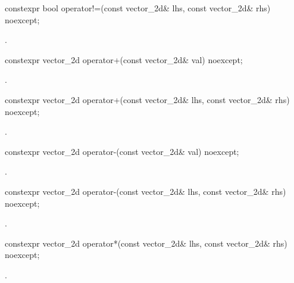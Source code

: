 %
\begin{itemdecl}
constexpr bool operator!=(const vector_2d& lhs, const vector_2d& rhs) noexcept;
\end{itemdecl}
\begin{itemdescr}
\pnum
\returns
{}.
\end{itemdescr}

%
\begin{itemdecl}
constexpr vector_2d operator+(const vector_2d& val) noexcept;
\end{itemdecl}
\begin{itemdescr}
\pnum
\returns
{}.
\end{itemdescr}

%
\begin{itemdecl}
constexpr vector_2d operator+(const vector_2d& lhs, const vector_2d& rhs) 
  noexcept;
\end{itemdecl}
\begin{itemdescr}
\pnum
\returns
{}.
\end{itemdescr}

%
\begin{itemdecl}
constexpr vector_2d operator-(const vector_2d& val) noexcept;
\end{itemdecl}
\begin{itemdescr}
\pnum
\returns
{}.
\end{itemdescr}

%
\begin{itemdecl}
constexpr vector_2d operator-(const vector_2d& lhs, const vector_2d& rhs) 
  noexcept;
\end{itemdecl}
\begin{itemdescr}
\pnum
\returns
{}.
\end{itemdescr}

%
\begin{itemdecl}
constexpr vector_2d operator*(const vector_2d& lhs, const vector_2d& rhs) 
  noexcept;
\end{itemdecl}
\begin{itemdescr}
\pnum
\returns
{}.
\end{itemdescr}

